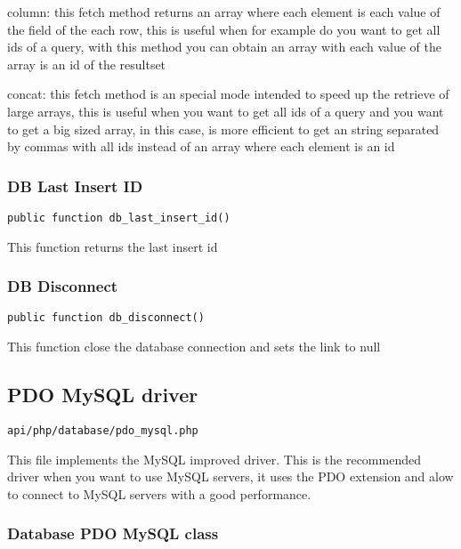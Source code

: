 \documentclass[a4paper]{article}
\begin{document}
column: this fetch method returns an array where each element is each value of the field of
the each row, this is useful when for example do you want to get all ids of a query, with
this method you can obtain an array with each value of the array is an id of the resultset

concat: this fetch method is an special mode intended to speed up the retrieve of large
arrays, this is useful when you want to get all ids of a query and you want to get a big
sized array, in this case, is more efficient to get an string separated by commas with all
ids instead of an array where each element is an id

\hypertarget{toc334}{}
\subsubsection{DB Last Insert ID}

\begin{lstlisting}
public function db_last_insert_id()
\end{lstlisting}

This function returns the last insert id

\hypertarget{toc335}{}
\subsubsection{DB Disconnect}

\begin{lstlisting}
public function db_disconnect()
\end{lstlisting}

This function close the database connection and sets the link to null

\hypertarget{toc336}{}
\subsection{PDO MySQL driver}

\begin{lstlisting}
api/php/database/pdo_mysql.php
\end{lstlisting}

This file implements the MySQL improved driver. This is the recommended driver when you want
to use MySQL servers, it uses the PDO extension and alow to connect to MySQL servers with a
good performance.

\hypertarget{toc337}{}
\subsubsection{Database PDO MySQL class}
\end{document}
